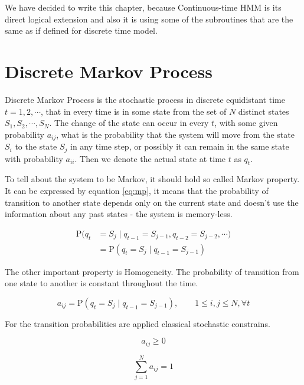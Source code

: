 \documentclass[thesis=M,english]{FITthesis}[2012/10/20]
\begin{document}
We have decided to write this chapter, because Continuous-time HMM is its direct logical extension and also it is using some of the subroutines that are the same as if defined for discrete time model.

\section{Discrete Markov Process}
    
Discrete Markov Process is the stochastic process in discrete equidistant time $t= 1,2,\cdots$, that in every time is in some state from the set of $N$ distinct states $S_1,S_2, \cdots, S_N $. The change of the state can occur in every $t$, with some given probability $a_{ij}$, what is the probability that the system will move from the state $S_i$ to the state $S_j$ in any time step, or possibly it can remain in the same state with probability $a_{ii}$. Then we denote the actual state at time $t$ as $q_t$.

To tell about the system to be Markov, it should hold so called Markov property. It can be expressed by equation \eqref{eq:mp}, it means that the probability of transition to another state depends only on the current state and doesn't use the information about any past states - the system is memory-less.

\begin{equation}\label{eq:mp}
\begin{aligned}
\mathrm{P}(q_t & = S_j \mid q_{t-1} = S_{j-1}, q_{t-2} = S_{j-2}, \cdots)  \\   
               & = \mathrm{P}(q_t = S_j \mid q_{t-1} = S_{j-1} )
\end{aligned}
\end{equation}

The other important property is Homogeneity. The probability of transition from one state to another is constant throughout the time. 

\begin{equation}\label{eq:homo}
   a_{ij} = \mathrm{P}(q_t = S_j \mid q_{t-1} = S_{j-1} ),\qquad 1 \leq i,j \leq N, \forall t
\end{equation}

For the transition probabilities are applied classical stochastic constrains.

\begin{equation}
   a_{ij} \geq 0
\end{equation}

\begin{equation}
   \sum_{j=1}^N a_{ij} = 1
\end{equation}
\end{document}
